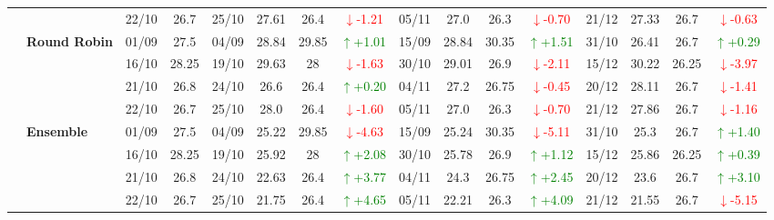 {\begin{longtable}{llcc|cccc|cccc|cccc}
&
& 22/10 & 26.7 & 25/10 & 27.61 & 26.4 & \textcolor{red}{\(\downarrow\)-1.21} & 05/11 & 27.0 & 26.3 & \textcolor{red}{\(\downarrow\)-0.70} & 21/12 & 27.33 & 26.7 & \textcolor{red}{\(\downarrow\)-0.63} \\
\cmidrule(lr){2-16}


& \textbf{Round Robin}
& 01/09 & 27.5 & 04/09 & 28.84 & 29.85 & \textcolor{green}{\(\uparrow\)+1.01} & 15/09 & 28.84 & 30.35 & \textcolor{green}{\(\uparrow\)+1.51} & 31/10 & 26.41 & 26.7 & \textcolor{green}{\(\uparrow\)+0.29} \\

& 
& 16/10 & 28.25 & 19/10 & 29.63 & 28 & \textcolor{red}{\(\downarrow\)-1.63} & 30/10 & 29.01 & 26.9 & \textcolor{red}{\(\downarrow\)-2.11} & 15/12 & 30.22 & 26.25 & \textcolor{red}{\(\downarrow\)-3.97} \\

& 
& 21/10 & 26.8 & 24/10 & 26.6 & 26.4 & \textcolor{green}{\(\uparrow\)+0.20} & 04/11 & 27.2 & 26.75 & \textcolor{red}{\(\downarrow\)-0.45} & 20/12 & 28.11 & 26.7 & \textcolor{red}{\(\downarrow\)-1.41} \\

&
& 22/10 & 26.7 & 25/10 & 28.0 & 26.4 & \textcolor{red}{\(\downarrow\)-1.60} & 05/11 & 27.0 & 26.3 & \textcolor{red}{\(\downarrow\)-0.70} & 21/12 & 27.86 & 26.7 & \textcolor{red}{\(\downarrow\)-1.16} \\
\cmidrule(lr){2-16}


& \textbf{Ensemble}
& 01/09 & 27.5 & 04/09 & 25.22 & 29.85& \textcolor{red}{\(\downarrow\)-4.63} & 15/09 & 25.24 & 30.35 & \textcolor{red}{\(\downarrow\)-5.11} & 31/10 & 25.3 & 26.7 & \textcolor{green}{\(\uparrow\)+1.40} \\

& 
& 16/10 & 28.25 & 19/10 & 25.92 & 28 & \textcolor{green}{\(\uparrow\)+2.08} & 30/10 & 25.78 & 26.9 & \textcolor{green}{\(\uparrow\)+1.12} & 15/12 & 25.86 & 26.25 & \textcolor{green}{\(\uparrow\)+0.39} \\

& 
& 21/10 & 26.8 & 24/10 & 22.63 & 26.4 & \textcolor{green}{\(\uparrow\)+3.77} & 04/11 & 24.3 & 26.75 & \textcolor{green}{\(\uparrow\)+2.45} & 20/12 & 23.6 & 26.7 & \textcolor{green}{\(\uparrow\)+3.10} \\

&
& 22/10 & 26.7 & 25/10 & 21.75 & 26.4 & \textcolor{green}{\(\uparrow\)+4.65} & 05/11 & 22.21 & 26.3 & \textcolor{green}{\(\uparrow\)+4.09} & 21/12 & 21.55 & 26.7 & \textcolor{red}{\(\downarrow\)-5.15} \\
\midrule




\end{longtable}}
